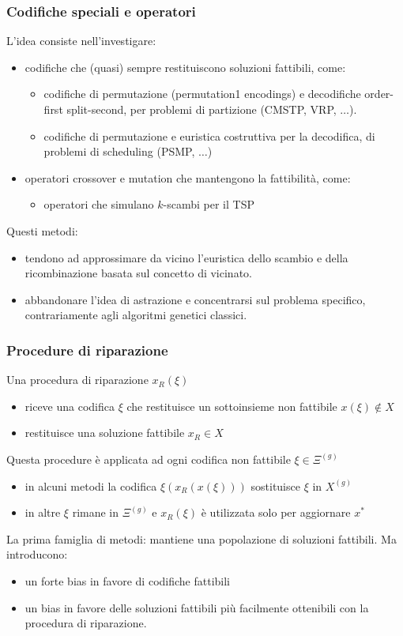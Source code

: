 \documentclass{article}
\begin{document}
\subsubsection{Codifiche speciali e operatori}
L'idea consiste nell'investigare:
\begin{itemize}
    \item codifiche che (quasi) sempre restituiscono soluzioni fattibili, come:
    \begin{itemize}
        \item codifiche di permutazione (permutation1 encodings) e decodifiche
        order-first split-second, per problemi di partizione (CMSTP, VRP, $\dots$).
        \item codifiche di permutazione e euristica costruttiva per la decodifica,
        di problemi di scheduling (PSMP, $\dots$)
    \end{itemize}
    \item operatori crossover e mutation che mantengono la fattibilità, come:
    \begin{itemize}
        \item operatori che simulano $k$-scambi per il TSP
    \end{itemize}
\end{itemize}
Questi metodi:
\begin{itemize}
    \item tendono ad approssimare da vicino l'euristica dello scambio e della
    ricombinazione basata sul concetto di vicinato.
    \item abbandonare l'idea di astrazione e concentrarsi sul problema specifico,
    contrariamente agli algoritmi genetici classici.
\end{itemize}

\subsubsection{Procedure di riparazione}
Una procedura di riparazione $x_R(\xi)$
\begin{itemize}
    \item riceve una codifica $\xi$ che restituisce un sottoinsieme non fattibile
    $x(\xi)\notin X$
    \item restituisce una soluzione fattibile $x_R\in X$
\end{itemize}
Questa procedure è applicata ad ogni codifica non fattibile $\xi\in\Xi^{(g)}$
\begin{itemize}
    \item in alcuni metodi la codifica $\xi(x_R(x(\xi)))$ sostituisce $\xi$ in $X^{(g)}$
    \item in altre $\xi$ rimane in $\Xi^{(g)}$ e $x_R(\xi)$ è utilizzata solo per aggiornare $x^*$
\end{itemize}
La prima famiglia di metodi: mantiene una popolazione di soluzioni fattibili. Ma
introducono:
\begin{itemize}
    \item un forte bias in favore di codifiche fattibili
    \item un bias in favore delle soluzioni fattibili più facilmente ottenibili
    con la procedura di riparazione.
\end{itemize}
\end{document}

